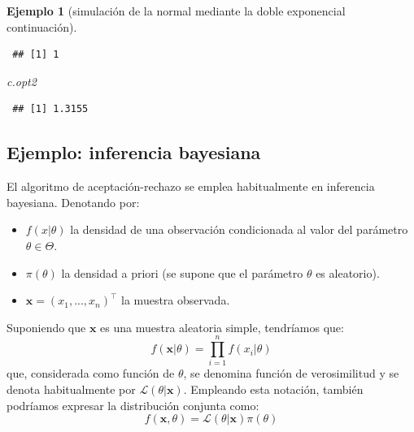 \documentclass[
  10pt,
]{book}
\newenvironment{Shaded}{\begin{snugshade}}{\end{snugshade}}
\newcommand{\AttributeTok}[1]{\textcolor[rgb]{0.77,0.63,0.00}{#1}}
\newcommand{\CommentTok}[1]{\textcolor[rgb]{0.56,0.35,0.01}{\textit{#1}}}
\newcommand{\DecValTok}[1]{\textcolor[rgb]{0.00,0.00,0.81}{#1}}
\newcommand{\FloatTok}[1]{\textcolor[rgb]{0.00,0.00,0.81}{#1}}
\newcommand{\FunctionTok}[1]{\textcolor[rgb]{0.00,0.00,0.00}{#1}}
\newcommand{\NormalTok}[1]{#1}
\newcommand{\OtherTok}[1]{\textcolor[rgb]{0.56,0.35,0.01}{#1}}
\newcommand{\SpecialCharTok}[1]{\textcolor[rgb]{0.00,0.00,0.00}{#1}}
\renewcommand{\mathbf}[1]{\symbf{#1}}
\theoremstyle{break}
\newtheorem{example}{Ejemplo}[chapter]
\theoremstyle{nonumberplain}
\renewcommand{\CommentTok}[1]{\textcolor[rgb]{0.41,0.41,0.41}{\texttt{#1}}}
\begin{document}
\begin{example}[simulación de la normal mediante la doble exponencial continuación]
\begin{Shaded}
\end{Shaded}

\begin{verbatim}
 ## [1] 1
\end{verbatim}

\begin{Shaded}
\begin{Highlighting}[]
\NormalTok{c.opt2}
\end{Highlighting}
\end{Shaded}

\begin{verbatim}
 ## [1] 1.3155
\end{verbatim}

\end{example}

\hypertarget{bayes-ar}{%
\subsection{Ejemplo: inferencia bayesiana}\label{bayes-ar}}

El algoritmo de aceptación-rechazo se emplea habitualmente en inferencia bayesiana.
Denotando por:

\begin{itemize}
\item
  \(f(x | \theta)\) la densidad de una observación condicionada al valor del parámetro \(\theta \in \Theta\).
\item
  \(\pi(\theta)\) la densidad a priori (se supone que el parámetro \(\theta\) es aleatorio).
\item
  \(\mathbf{x}=(x_1,...,x_n)^{\top}\) la muestra observada.
\end{itemize}

Suponiendo que \(\mathbf{x}\) es una muestra aleatoria simple, tendríamos que:
\[f(\mathbf{x}|\theta) = \prod\limits_{i=1}^{n}f(x_i | \theta)\]
que, considerada como función de \(\theta\), se denomina función de verosimilitud y se denota habitualmente por \(\mathcal{L}(\theta | \mathbf{x})\).
Empleando esta notación, también podríamos expresar la distribución conjunta como:
\[f(\mathbf{x}, \theta) = \mathcal{L}(\theta | \mathbf{x})\pi(\theta)\]
\end{document}
